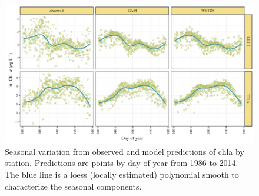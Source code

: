\documentclass{svjour3}\usepackage[]{graphicx}\usepackage[]{color}
\makeatletter
\def\maxwidth{ %
  \ifdim\Gin@nat@width>\linewidth
    \linewidth
  \else
    \Gin@nat@width
  \fi
}
\newenvironment{knitrout}{}{} %
\makeatother
\begin{document}
\begin{knitrout}
\color{fgcolor}\begin{figure}[!ht]

{\centering \includegraphics[width=\maxwidth]{figs/seas-1} 

}

\caption[Seasonal variation from observed and model predictions of \ac{chla} by station]{Seasonal variation from observed and model predictions of \ac{chla} by station.  Predictions are points by day of year from 1986 to 2014.  The blue line is a loess (locally estimated) polynomial smooth to characterize the seasonal components.}\label{fig:seas}
\end{figure}


\end{knitrout}
\end{document}
